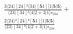 \documentclass[varwidth, border=5pt]{standalone}
\begin{document}
\begin{my}
$\begin{gathered}
\scriptscriptstyle\frac{3⟨24⟩[24]²⟨34⟩[𝟓1][1|𝟓|𝟓⟩}{⟨23⟩[34]²⟨4|2+3|1]s_{234}} +\\
\scriptscriptstyle\frac{2⟨24⟩²[24]³[𝟓1][1|𝟓|𝟓⟩}{⟨23⟩[34]³⟨4|2+3|1]s_{234}} \phantom{+}
\end{gathered}$
\end{my}
\end{document}
